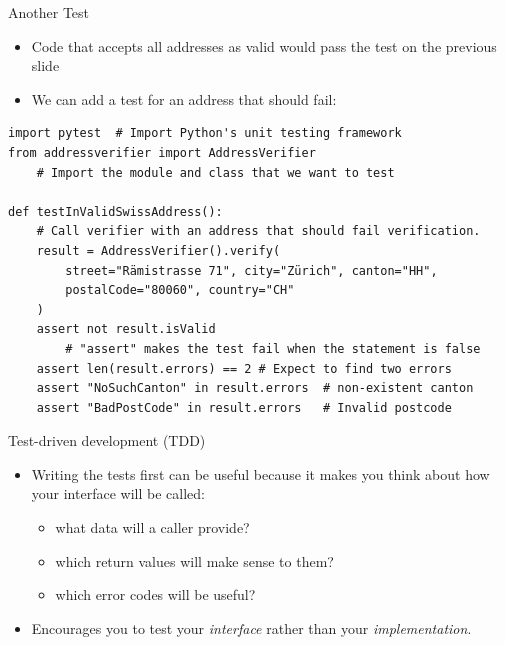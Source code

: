 \documentclass[
ps,
]{prosper}
\begin{document}
\begin{slide}{Another Test}

\begin{itemize}
  
\item Code that accepts all addresses as valid would pass the test on the previous slide

\item We can add a test for an address that should fail:

\end{itemize}

\begin{tiny}
\begin{verbatim}
import pytest  # Import Python's unit testing framework
from addressverifier import AddressVerifier 
    # Import the module and class that we want to test
                  
def testInValidSwissAddress():
    # Call verifier with an address that should fail verification. 
    result = AddressVerifier().verify(
        street="Rämistrasse 71", city="Zürich", canton="HH",  
        postalCode="80060", country="CH"
    )                                                              
    assert not result.isValid  
        # "assert" makes the test fail when the statement is false
    assert len(result.errors) == 2 # Expect to find two errors
    assert "NoSuchCanton" in result.errors  # non-existent canton
    assert "BadPostCode" in result.errors   # Invalid postcode
\end{verbatim}
\end{tiny}
  
\end{slide}



\begin{slide}{Test-driven development (TDD)}

  \begin{itemize}
    
  \item Writing the tests first can be useful because it makes you think about how your interface will be called:
    
    \begin{itemize}
    \item what data will a caller provide?
    \item which return values will make sense to them?
    \item which error codes will be useful?
    \end{itemize}
    
  \item Encourages you to test your \textit{interface} rather than your \textit{implementation}.
    
  \end{itemize}
  
\end{slide}
\end{document}
